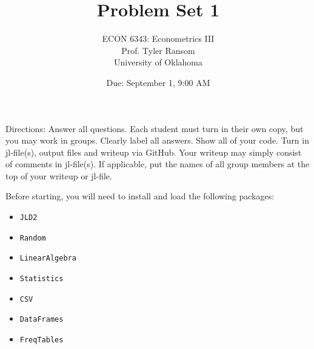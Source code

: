 \documentclass[12pt,english]{article}
\begin{document}
\title{Problem Set 1}
\author{ECON 6343: Econometrics III\\
Prof. Tyler Ransom\\
University of Oklahoma}
\date{Due: September 1, 9:00 AM}

\maketitle
Directions: Answer all questions. Each student must turn in their own copy, but you may work in groups. Clearly label all answers. Show all of your code. Turn in jl-file(s), output files and writeup via GitHub. Your writeup may simply consist of comments in jl-file(s). If applicable, put the names of all group members at the top of your writeup or jl-file.


Before starting, you will need to install and load the following packages:
\begin{itemize}
    \item[~] \texttt{JLD2}
    \item[~] \texttt{Random}
    \item[~] \texttt{LinearAlgebra}
    \item[~] \texttt{Statistics}
    \item[~] \texttt{CSV} 
    \item[~] \texttt{DataFrames} 
    \item[~] \texttt{FreqTables} 
\end{itemize}
\end{document}
